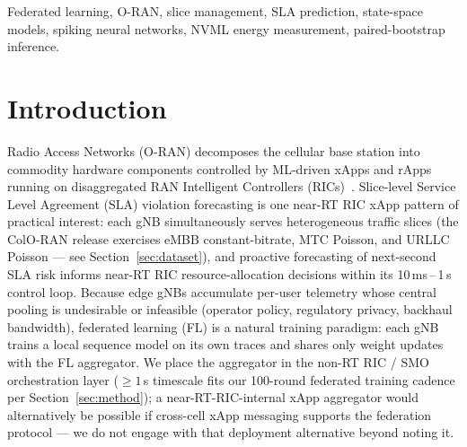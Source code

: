 \documentclass[journal]{IEEEtran}
\begin{document}
\begin{IEEEkeywords}
Federated learning, O-RAN, slice management, SLA prediction, state-space models, spiking neural networks, NVML energy measurement, paired-bootstrap inference.
\end{IEEEkeywords}


\section{Introduction}\label{sec:intro}

 Radio Access Networks (O-RAN) decomposes the cellular base station into commodity hardware components controlled by ML-driven xApps and rApps running on disaggregated RAN Intelligent Controllers (RICs)~\cite{Polese2022}. Slice-level Service Level Agreement (SLA) violation forecasting is one near-RT RIC xApp pattern of practical interest: each gNB simultaneously serves heterogeneous traffic slices (the ColO-RAN release exercises eMBB constant-bitrate, MTC Poisson, and URLLC Poisson --- see Section~\ref{sec:dataset}), and proactive forecasting of next-second SLA risk informs near-RT RIC resource-allocation decisions within its 10\,ms\,--\,1\,s control loop. Because edge gNBs accumulate per-user telemetry whose central pooling is undesirable or infeasible (operator policy, regulatory privacy, backhaul bandwidth), federated learning (FL) is a natural training paradigm: each gNB trains a local sequence model on its own traces and shares only weight updates with the FL aggregator. We place the aggregator in the non-RT RIC / SMO orchestration layer ($\geq 1$\,s timescale fits our 100-round federated training cadence per Section~\ref{sec:method}); a near-RT-RIC-internal xApp aggregator would alternatively be possible if cross-cell xApp messaging supports the federation protocol --- we do not engage with that deployment alternative beyond noting it.
\end{document}
